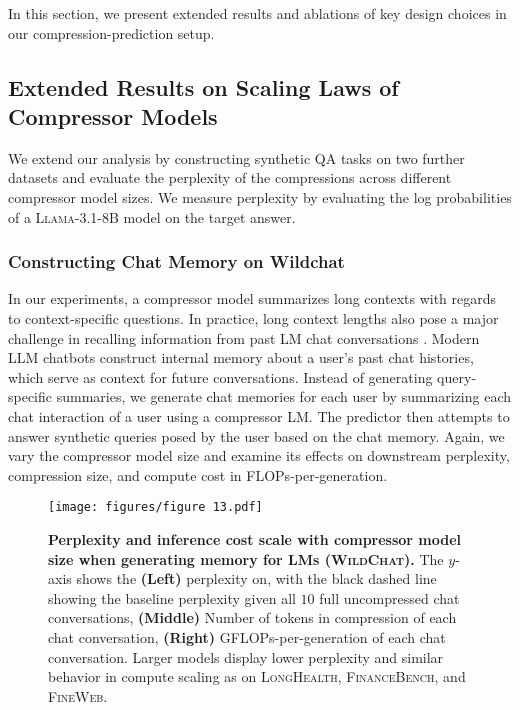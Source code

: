 \documentclass{article} %
\begin{document}
In this section, we present extended results and ablations of key design choices in our compression-prediction setup.

\subsection{Extended Results on Scaling Laws of Compressor Models}
\label{sec:scaling-laws-appendix}

We extend our analysis by constructing synthetic QA tasks on two further datasets and evaluate the perplexity of the compressions across different compressor model sizes. We measure perplexity by evaluating the log probabilities of a \textsc{Llama-3.1-8B} model on the target answer. %

\subsubsection{Constructing Chat Memory on Wildchat}
\label{sec:wildchat-results-appendix}

In our experiments, a compressor model summarizes long contexts with regards to context-specific questions. In practice, long context lengths also pose a major challenge in recalling information from past LM chat conversations \citep{eyuboglu2025cartridges}. Modern LLM chatbots construct internal memory about a user's past chat histories, which serve as context for future conversations. Instead of generating query-specific summaries, we generate chat memories for each user by summarizing each chat interaction of a user using a compressor LM. The predictor then attempts to answer synthetic queries posed by the user based on the chat memory. Again, we vary the compressor model size and examine its effects on downstream perplexity, compression size, and compute cost in FLOPs-per-generation.

\begin{figure}[ht]
    \centering
    \texttt{[image: figures/figure 13.pdf]}
    \caption{\textbf{Perplexity and inference cost scale with compressor model size when generating memory for LMs (\textsc{WildChat}).} The $y$-axis shows the \textbf{(Left)} perplexity on, with the black dashed line showing the baseline perplexity given all $10$ full uncompressed chat conversations, \textbf{(Middle)} Number of tokens in compression of each chat conversation, \textbf{(Right)} GFLOPs-per-generation of each chat conversation. Larger models display lower perplexity and similar behavior in compute scaling as on \textsc{LongHealth}, \textsc{FinanceBench}, and \textsc{FineWeb}.}
    \label{fig:figure-13-wildchat}
\end{figure}
\end{document}

